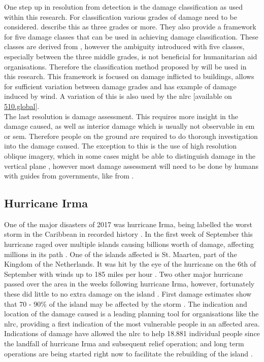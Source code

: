 One step up in resolution from detection is the damage classification as used within this research. For classification various grades of damage need to be considered. \cite{Dong2013} describe this as three grades or more. They also provide a framework for five damage classes that can be used in achieving damage classification. These classes are derived from \citet{Grunthal1998}, however the ambiguity introduced with five classes, especially between the three middle grades, is not beneficial for humanitarian aid organisations. Therefore the classification method proposed by \citet{AlAchkar2008} will be used in this research. This framework is focused on damage inflicted to buildings, allows for sufficient variation between damage grades and has example of damage induced by wind. A variation of this is also used by the \ac{nlrc} [available on \href{https://www.510.global/visual-guide-damage-assesment/}{510.global}].\\

The last resolution is damage assessment. This requires more insight in the damage caused, as well as interior damage which is usually not observable in \ac{em} or \ac{sem}. Therefore people on the ground are required to do thorough investigation into the damage caused. The exception to this is the use of high resolution oblique imagery, which in some cases might be able to distinguish damage in the vertical plane \citep{Vetrivel2016a}, however most damage assessment will need to be done by humans with guides from governments, like from \citet{FEMA2016}.\\

\subsection{Hurricane Irma}
One of the major disasters of 2017 was hurricane Irma, being labelled the worst storm in the Caribbean in recorded history \citep{Daniell2017}. In the first week of September this hurricane raged over multiple islands causing billions worth of damage, affecting millions in its path \citep{Phipps2017,Daniell2017}. One of the islands affected is St. Maarten, part of the Kingdom of the Netherlands. It was hit by the eye of the hurricane on the 6th of September with winds up to 185 miles per hour \citep{Wilts2017}. Two other major hurricane passed over the area in the weeks following hurricane Irma, however, fortunately these did little to no extra damage on the island \citep{Gray2017,Bijnsdorp2017}. First damage estimates show that 70 - 90\% of the island may be affected by the storm \citep{Rodekruis2017,UNOSAT2017}. The indication and location of the damage caused is a leading planning tool for organisations like the \ac{nlrc}, providing a first indication of the most vulnerable people in an affected area. Indications of damage have allowed the \ac{nlrc} to help 18.881 individual people since the landfall of hurricane Irma and subsequent relief operation; and long term operations are being started right now to facilitate the rebuilding of the island \citep{Rodekruis2017}. 


